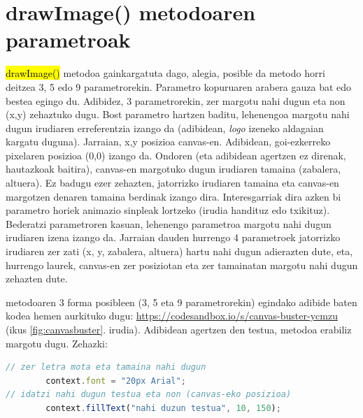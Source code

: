 \section{drawImage() metodoaren parametroak}
        \hl{drawImage()} metodoa gainkargatuta dago, alegia, posible da metodo horri deitzea 3, 5 edo 9 parametrorekin. Parametro kopuruaren arabera gauza bat edo bestea egingo du. Adibidez, 3 parametrorekin, zer margotu nahi dugun eta non (x,y) zehaztuko dugu. Bost parametro hartzen baditu, lehenengoa margotu nahi dugun irudiaren erreferentzia izango da (adibidean, \textit{logo} izeneko aldagaian kargatu duguna). Jarraian, x,y posizioa canvas-en. Adibidean, goi-ezkerreko pixelaren posizioa (0,0) izango da. Ondoren (eta adibidean agertzen ez direnak, hautazkoak baitira), canvas-en margotuko dugun irudiaren tamaina (zabalera, altuera). Ez badugu ezer zehazten, jatorrizko irudiaren tamaina eta canvas-en margotzen denaren tamaina berdinak izango dira. Interesgarriak dira azken bi parametro horiek animazio sinpleak lortzeko (irudia handituz edo txikituz). Bederatzi parametroren kasuan, lehenengo parametroa margotu nahi dugun irudiaren izena izango da. Jarraian dauden hurrengo 4 parametroek jatorrizko irudiaren zer zati (x, y, zabalera, altuera) hartu nahi dugun adierazten dute, eta, hurrengo laurek, canvas-en zer posiziotan eta zer tamainatan margotu nahi dugun zehazten dute.


 metodoaren 3 forma posibleen (3, 5 eta 9 parametrorekin) egindako adibide baten kodea hemen aurkituko dugu: \href{https://codesandbox.io/s/canvas-buster-ycmzu}{https://codesandbox.io/s/canvas-buster-ycmzu} (ikus \ref{fig:canvasbuster}. irudia).
Adibidean agertzen den testua,  metodoa erabiliz margotu dugu. Zehazki:

\begin{lstlisting}[language=JavaScript,numbers=none]
// zer letra mota eta tamaina nahi dugun
        context.font = "20px Arial"; 
// idatzi nahi dugun testua eta non (canvas-eko posizioa)
        context.fillText("nahi duzun testua", 10, 150); 
\end{lstlisting}
        
